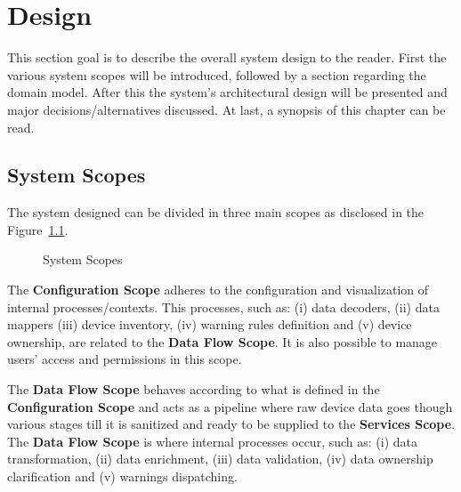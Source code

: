 \chapter{Design}
\label{chap:design}

This section goal is to describe the overall system design to the reader.
First the various system scopes will be introduced, followed by a section regarding the domain model.
After this the system's architectural design will be presented and major decisions/alternatives discussed. At last, a synopsis of this chapter can be read.



\section{System Scopes}
\label{sec:design:system_scopes}

The system designed can be divided in three main scopes as disclosed in the Figure~\ref{fig:design:system_scopes:scopes}.

\begin{figure}[H]
    \centering
   \resizebox{\columnwidth}{!}
   {
      
   }
   \caption[System Scopes]{System Scopes}
   \label{fig:design:system_scopes:scopes}
\end{figure}

The \textbf{Configuration Scope} adheres to the configuration and visualization of internal processes/contexts. This processes, such as: (i) data decoders, (ii) data mappers (iii) device inventory, (iv) warning rules definition and (v) device ownership, are related to the \textbf{Data Flow Scope}. It is also possible to manage users' access and permissions in this scope.

The \textbf{Data Flow Scope} behaves according to what is defined in the \textbf{Configuration Scope} and acts as a pipeline where raw device data goes though various stages till it is sanitized and ready to be supplied to the \textbf{Services Scope}. The \textbf{Data Flow Scope} is where internal processes occur, such as: (i) data transformation, (ii) data enrichment, (iii) data validation, (iv) data ownership clarification and (v) warnings dispatching.

